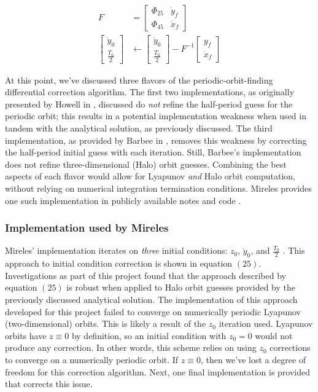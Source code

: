 \documentclass[conf]{new-aiaa}
\begin{document}
\begin{multicols}{2}
\begin{equation}
    \begin{aligned}
        F &= \begin{bmatrix} \Phi_{25} & \dot{y}_f \\ \Phi_{45} & \ddot{x}_f \end{bmatrix} \\
        \begin{bmatrix} \dot{y}_0 \\ \frac{T_0}{2} \end{bmatrix} & \leftarrow 
        \begin{bmatrix} \dot{y}_0 \\ \frac{T_0}{2} \end{bmatrix} - F^{-1} \begin{bmatrix} y_f \\ \dot{x}_f \end{bmatrix}
    \end{aligned}
\end{equation}

At this point, we've discussed three flavors of the periodic-orbit-finding 
differential correction algorithm. The first two implementations, 
as originally presented by Howell in \cite{howell1984three}, discussed 
do \textit{not} refine the half-period guess for the periodic orbit; this 
results in a potential implementation weakness when used in tandem with 
the analytical solution, as previously discussed. The third implementation,
as provided by Barbee in \cite{barbeeCode}, removes this weakness by 
correcting the half-period initial guess with each iteration. Still, Barbee's
implementation does not refine three-dimensional (Halo) orbit guesses.
Combining the best aspects of each flavor would allow for Lyapunov \textit{and}
Halo orbit computation, without relying on numerical integration
termination conditions. Mireles provides one such implementation in 
publicly available notes and code \cite{mirelesNotes} \cite{mirelesCode}.

\subsubsection{Implementation used by Mireles}
Mireles' implementation iterates on \textit{three} initial conditions:
$z_0$, $\dot{y}_0$, and $\frac{T_0}{2}$ \cite{mirelesNotes} \cite{mirelesCode}.
This approach to initial condition correction is shown in equation $(25)$.
Investigations as part of this project found that the approach described by 
equation $(25)$ is robust when applied to Halo orbit guesses provided 
by the previously discussed analytical solution. The implementation of this 
approach developed for this project failed to converge on numerically 
periodic Lyapunov (two-dimensional) orbits. This is likely a result 
of the $z_0$ iteration used. Lyapunov orbits have $z \equiv 0$ by definition, 
so an initial condition with $z_0 = 0$ would not produce any correction.
In other words, this scheme relies on using $z_0$ corrections to 
converge on a numerically periodic orbit. If $z \equiv 0$, then we've lost 
a degree of freedom for this correction algorithm. Next, one final 
implementation is provided that corrects this issue.


\end{multicols}
\end{document}
